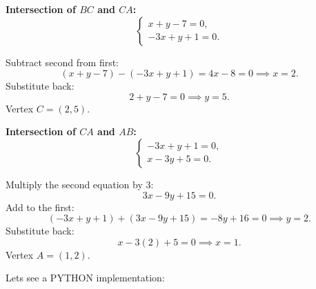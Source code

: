 \documentclass[10pt,twocolumn]{article}
\begin{document}
\textbf{Intersection of \(BC\) and \(CA\):}
\[
\begin{cases}
x + y - 7 = 0, \\
-3x + y + 1 = 0.
\end{cases}
\]

Subtract second from first:
\[
(x + y - 7) - (-3x + y + 1) = 4x - 8 = 0 \implies x = 2.
\]
Substitute back:
\[
2 + y - 7 = 0 \implies y = 5.
\]
Vertex \(C = (2,5)\).

\textbf{Intersection of \(CA\) and \(AB\):}
\[
\begin{cases}
-3x + y + 1 = 0, \\
x - 3y + 5 = 0.
\end{cases}
\]

Multiply the second equation by 3:
\[
3x - 9y + 15 = 0.
\]
Add to the first:
\[
(-3x + y + 1) + (3x - 9y + 15) = -8y + 16 = 0 \implies y = 2.
\]
Substitute back:
\[
x - 3(2) + 5 = 0 \implies x = 1.
\]
Vertex \(A = (1,2)\).

Lets see a PYTHON implementation:
\end{document}
